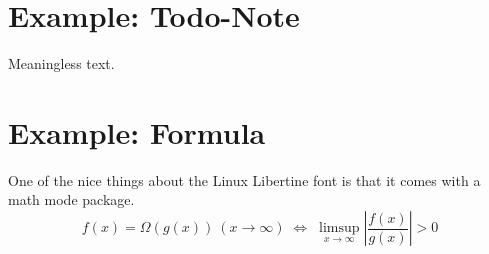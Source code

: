 \section{Example: Todo-Note}
Meaningless text.

\section{Example: Formula}
One of the nice things about the Linux Libertine font is that it comes with
a math mode package.
\begin{displaymath}
f(x)=\Omega(g(x))\ (x\rightarrow\infty)\;\Leftrightarrow\;
\limsup_{x \to \infty} \left|\frac{f(x)}{g(x)}\right|> 0
\end{displaymath}

